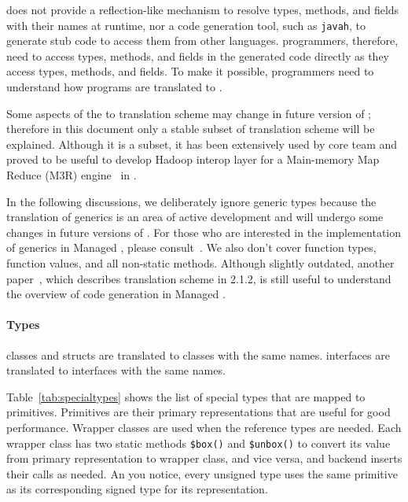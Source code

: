 \Xten{} does not provide a \Java{} reflection-like mechanism to resolve \Xten{}
types, methods, and fields with their names at runtime, nor a code
generation tool, such as \verb|javah|, to generate stub code to access
them from other languages.  \Java{} programmers, therefore, need to
access \Xten{} types, methods, and fields in the generated \Java{} code
directly as they access \Java{} types, methods, and fields.  To make it
possible, \Java{} programmers need to understand how \Xten{} programs are
translated to \Java{}.

Some aspects of the \Xten{} to \Java{} translation scheme may change in
future version of \Xten{}; therefore in this document only a stable
subset of translation scheme will be explained.  Although it is a
subset, it has been extensively used by \Xten{} core team and proved to be
useful to develop \Java{} Hadoop interop layer for a Main-memory Map
Reduce (M3R) engine~\cite{Shinnar12M3R} in \Xten{}.

In the following discussions, we deliberately ignore generic \Xten{}
types because the translation of generics is an area of active
development and will undergo some changes in future versions of \Xten{}.
For those who are interested in the implementation of generics
in Managed \Xten{}, please consult~\cite{TakeuchiX1012}.  We also don't
cover function types, function values, and all non-static methods.
Although slightly outdated, another paper~\cite{TakeuchiX1011}, which
describes translation scheme in \Xten{} 2.1.2, is still useful to
understand the overview of \Java{} code generation in Managed \Xten{}.


\paragraph{Types}

\Xten{} classes and structs are translated to \Java{} classes with the same
names.  \Xten{} interfaces are translated to \Java{} interfaces with the same
names.

Table~\ref{tab:specialtypes} shows the list of special types that are
mapped to \Java{} primitives.  Primitives are their primary
representations that are useful for good performance.  Wrapper classes
are used when the reference types are needed.  Each wrapper class has
two static methods \verb|$box()| and \verb|$unbox()| to convert its
value from primary representation to wrapper class, and vice versa,
and \Java{} backend inserts their calls as needed.  An you notice, every
unsigned type uses the same \Java{} primitive as its corresponding signed
type for its representation.

